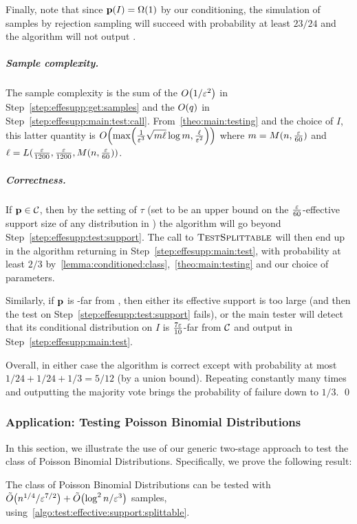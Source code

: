 Finally, note that since $\D(I) = \bigOmega{1}$ by our conditioning, the simulation of samples by rejection sampling will succeed with probability at least $23/24$ and the algorithm will not output \fail.

\subparagraph{Sample complexity.}
The sample complexity is the sum of the $\bigO{1/\eps^2}$ in Step~\ref{step:effesupp:get:samples} and the $\bigO{q}$ in Step~\ref{step:effesupp:main:test:call}. From~\cref{theo:main:testing} and the choice of $I$, this latter quantity is $\bigO{ \max\mleft(\frac{1}{\eps^3} \sqrt{m\ell} \log m, \frac{\ell}{\eps^2}\mright) }$ where $m = M(n,\frac{\varepsilon}{60})$ and $\ell=L(\frac{\varepsilon}{1200},\frac{\varepsilon}{1200}, M(n,\frac{\varepsilon}{60}))$.

\subparagraph{Correctness.} If $\mathbf{p}\in\mathcal{C}$, then by the setting of $\tau$ (set to be an upper bound on the $\frac{\varepsilon}{60}$-effective support size of any distribution in \class) the algorithm will go beyond Step~\ref{step:effesupp:test:support}. The call to $\textsc{TestSplittable}$ will then end up in the algorithm returning \accept in Step~\ref{step:effesupp:main:test}, with probability at least $2/3$ by~\cref{lemma:conditioned:class},~\cref{theo:main:testing} and our choice of parameters.

Similarly, if $\mathbf{p}$ is \eps-far from \class, then either its effective support is too large (and then the test on Step~\ref{step:effesupp:test:support} fails), or the main tester will detect that its conditional distribution on $I$ is $\frac{7\varepsilon}{10}$-far from $\mathcal{C}$ and output \reject in Step~\ref{step:effesupp:main:test}.

Overall, in either case the algorithm is correct except with probability at most $1/24+1/24+1/3=5/12$ (by a union bound). Repeating constantly many times and outputting the majority vote brings the probability of failure down to $1/3$. \qed

\subsubsection{Application: Testing Poisson Binomial Distributions}\label{ssec:testing:pbds}

In this section, we illustrate the use of our generic two-stage approach to test the class of Poisson Binomial Distributions. Specifically, we prove the following result:
\begin{corollary}\label{coro:main:testing:effective:support:pbd}
The class of Poisson Binomial Distributions can be tested with $\tildeO{{n}^{1/4}/\eps^{7/2}} + \tildeO{\log^2 n/\eps^3 }$ samples, using~\cref{algo:test:effective:support:splittable}.
\end{corollary}

